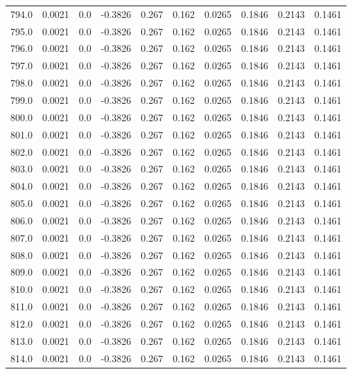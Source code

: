 \begin{longtable}{lrrrrrrrrr}
794.0 & 0.0021 & 0.0 & -0.3826 & 0.267 & 0.162 & 0.0265 & 0.1846 & 0.2143 & 0.1461 \\
795.0 & 0.0021 & 0.0 & -0.3826 & 0.267 & 0.162 & 0.0265 & 0.1846 & 0.2143 & 0.1461 \\
796.0 & 0.0021 & 0.0 & -0.3826 & 0.267 & 0.162 & 0.0265 & 0.1846 & 0.2143 & 0.1461 \\
797.0 & 0.0021 & 0.0 & -0.3826 & 0.267 & 0.162 & 0.0265 & 0.1846 & 0.2143 & 0.1461 \\
798.0 & 0.0021 & 0.0 & -0.3826 & 0.267 & 0.162 & 0.0265 & 0.1846 & 0.2143 & 0.1461 \\
799.0 & 0.0021 & 0.0 & -0.3826 & 0.267 & 0.162 & 0.0265 & 0.1846 & 0.2143 & 0.1461 \\
800.0 & 0.0021 & 0.0 & -0.3826 & 0.267 & 0.162 & 0.0265 & 0.1846 & 0.2143 & 0.1461 \\
801.0 & 0.0021 & 0.0 & -0.3826 & 0.267 & 0.162 & 0.0265 & 0.1846 & 0.2143 & 0.1461 \\
802.0 & 0.0021 & 0.0 & -0.3826 & 0.267 & 0.162 & 0.0265 & 0.1846 & 0.2143 & 0.1461 \\
803.0 & 0.0021 & 0.0 & -0.3826 & 0.267 & 0.162 & 0.0265 & 0.1846 & 0.2143 & 0.1461 \\
804.0 & 0.0021 & 0.0 & -0.3826 & 0.267 & 0.162 & 0.0265 & 0.1846 & 0.2143 & 0.1461 \\
805.0 & 0.0021 & 0.0 & -0.3826 & 0.267 & 0.162 & 0.0265 & 0.1846 & 0.2143 & 0.1461 \\
806.0 & 0.0021 & 0.0 & -0.3826 & 0.267 & 0.162 & 0.0265 & 0.1846 & 0.2143 & 0.1461 \\
807.0 & 0.0021 & 0.0 & -0.3826 & 0.267 & 0.162 & 0.0265 & 0.1846 & 0.2143 & 0.1461 \\
808.0 & 0.0021 & 0.0 & -0.3826 & 0.267 & 0.162 & 0.0265 & 0.1846 & 0.2143 & 0.1461 \\
809.0 & 0.0021 & 0.0 & -0.3826 & 0.267 & 0.162 & 0.0265 & 0.1846 & 0.2143 & 0.1461 \\
810.0 & 0.0021 & 0.0 & -0.3826 & 0.267 & 0.162 & 0.0265 & 0.1846 & 0.2143 & 0.1461 \\
811.0 & 0.0021 & 0.0 & -0.3826 & 0.267 & 0.162 & 0.0265 & 0.1846 & 0.2143 & 0.1461 \\
812.0 & 0.0021 & 0.0 & -0.3826 & 0.267 & 0.162 & 0.0265 & 0.1846 & 0.2143 & 0.1461 \\
813.0 & 0.0021 & 0.0 & -0.3826 & 0.267 & 0.162 & 0.0265 & 0.1846 & 0.2143 & 0.1461 \\
814.0 & 0.0021 & 0.0 & -0.3826 & 0.267 & 0.162 & 0.0265 & 0.1846 & 0.2143 & 0.1461 \\

\end{longtable}
